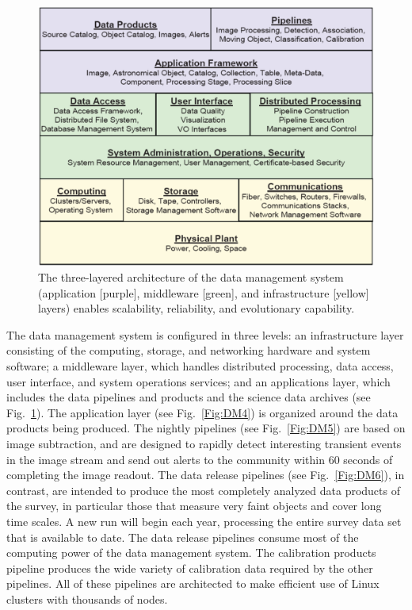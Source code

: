 \documentclass{emulateapj}
\begin{document}
\begin{figure}
\vskip 0.1in
\includegraphics[width=1.0\hsize,clip]{DMsandwich.pdf}
\caption{The three-layered architecture of the data management system 
(application [purple], middleware [green], and infrastructure [yellow] layers) 
enables scalability, reliability, and evolutionary capability.} 
\label{Fig:DM1}
\end{figure}

The data management system is configured in three levels: an
infrastructure layer consisting of the computing, storage, and
networking hardware and system software; a middleware layer, which
handles distributed processing, data access, user interface, and
system operations services; and an applications layer, which includes
the data pipelines and products and the science data archives (see
Fig.~\ref{Fig:DM1}). The application layer (see Fig.~\ref{Fig:DM4})
is organized around the data products being produced.  The nightly
pipelines (see Fig.~\ref{Fig:DM5}) are based on image subtraction,
and are designed to rapidly detect interesting transient events in the
image stream and send out alerts to the community within 60 seconds of
completing the image readout.  The data release
pipelines (see Fig.~\ref{Fig:DM6}), in contrast, are intended to
produce the most completely analyzed data products of the survey, in
particular those that measure very faint objects and cover long time
scales. A new run will begin each year, processing the entire survey data
set that is available to date. The data release pipelines consume most of the
computing power of the data management system.  The calibration
products pipeline produces the wide variety of calibration data
required by the other pipelines.  All of these pipelines are
architected to make efficient use of Linux clusters with thousands of
nodes.
\end{document}
